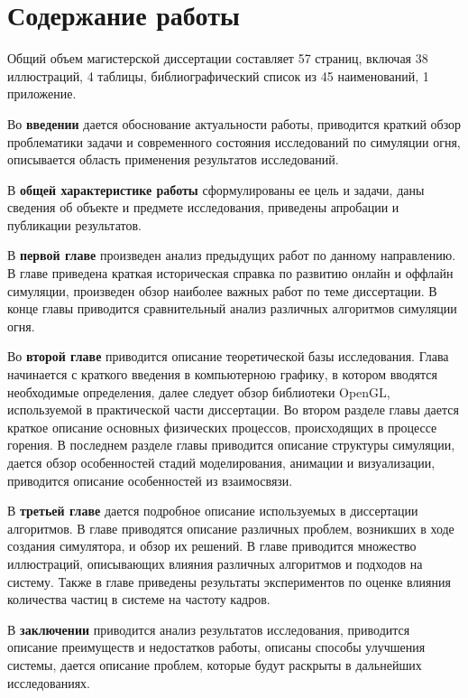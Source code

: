 \part*{Содержание работы}

Общий объем магистерской диссертации составляет 57 страниц, включая 38
иллюстраций, 4 таблицы, библиографический список из 45 наименований, 1
приложение.

Во \textbf{введении} дается обоснование актуальности работы, приводится краткий
обзор проблематики задачи и современного состояния исследований по симуляции
огня, описывается область применения результатов исследований.

В \textbf{общей характеристике работы} сформулированы ее цель и задачи, даны
сведения об объекте и предмете исследования, приведены апробации и публикации
результатов.

В \textbf{первой главе} произведен анализ предыдущих работ по данному
направлению. В главе приведена краткая историческая справка по развитию онлайн и
оффлайн симуляции, произведен обзор наиболее важных работ по теме диссертации. В
конце главы приводится сравнительный анализ различных алгоритмов симуляции огня.

Во \textbf{второй главе} приводится описание теоретической базы исследования.
Глава начинается с краткого введения в компьютерною графику, в котором
вводятся необходимые определения, далее следует обзор библиотеки
OpenGL, используемой в практической части диссертации. Во втором разделе главы
дается краткое описание основных физических процессов, происходящих в процессе
горения. В последнем разделе главы приводится описание структуры симуляции,
дается обзор особенностей стадий моделирования, анимации и визуализации,
приводится описание особенностей из взаимосвязи.

В \textbf{третьей главе} дается подробное описание используемых в диссертации
алгоритмов. В главе приводятся описание различных проблем, возникших в ходе
создания симулятора, и обзор их решений. В главе приводится множество
иллюстраций, описывающих влияния различных алгоритмов и подходов на систему.
Также в главе приведены результаты экспериментов по оценке влияния количества
частиц в системе на частоту кадров.

В \textbf{заключении} приводится анализ результатов исследования, приводится
описание преимуществ и недостатков работы, описаны способы улучшения системы,
дается описание проблем, которые будут раскрыты в дальнейших исследованиях.
